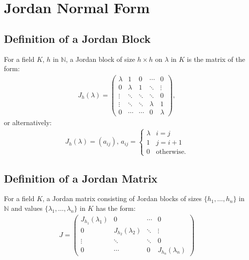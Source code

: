 \section{Jordan Normal Form}

\subsection{Definition of a Jordan Block}

For a field $K$, $h$ in $\mathbb{N}$, a Jordan block of size $h \times h$
on $\lambda$ in $K$ is the matrix of the form: \begin{gather*}
  J_h(\lambda) = \begin{pmatrix}
    \lambda & 1       & 0      & \cdots  & 0       \\
    0       & \lambda & 1      & \ddots  & \vdots  \\
    \vdots  & \ddots  & \ddots & \ddots  & 0       \\
    \vdots  & \ddots  & \ddots & \lambda & 1       \\
    0       & \cdots  & \cdots & 0       & \lambda
  \end{pmatrix},
\end{gather*} or alternatively: \begin{gather*}
  J_h(\lambda) = (a_{ij}), \, a_{ij} = \begin{cases}
    \lambda & i = j \\
    1       & j = i + 1 \\
    0       & \text{otherwise.}
  \end{cases}
\end{gather*}

\subsection{Definition of a Jordan Matrix}

For a field $K$, a Jordan matrix consisting of Jordan blocks of sizes 
$\{h_1, \ldots, h_n\}$ in $\mathbb{N}$ and values 
$\{\lambda_1, \ldots, \lambda_n\}$ in $K$ has the form: \begin{gather*}
  J = \begin{pmatrix}
    J_{h_1}(\lambda_1) & 0                  & \cdots & 0      \\
    0                  & J_{h_2}(\lambda_2) & \ddots & \vdots \\
    \vdots             & \ddots             & \ddots & 0      \\
    0                  & \cdots             & 0      & J_{h_n}(\lambda_n)
  \end{pmatrix}
\end{gather*}

